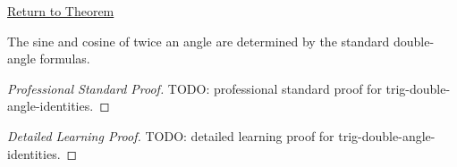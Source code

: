 \newpage
{}
\label{prf:trig-double-angle-identities}

\begin{remark*}[Return]
\hyperref[thm:trig-double-angle-identities]{Return to Theorem}
\end{remark*}

\begin{theorem*}
The sine and cosine of twice an angle are determined by the standard
double-angle formulas.
\end{theorem*}

\begin{proof}[Professional Standard Proof]
\LRAProofBodyStart
TODO: professional standard proof for trig-double-angle-identities.
\end{proof}

\begin{proof}[Detailed Learning Proof]
\LRAProofBodyStart
TODO: detailed learning proof for trig-double-angle-identities.
\end{proof}

\clearpage
